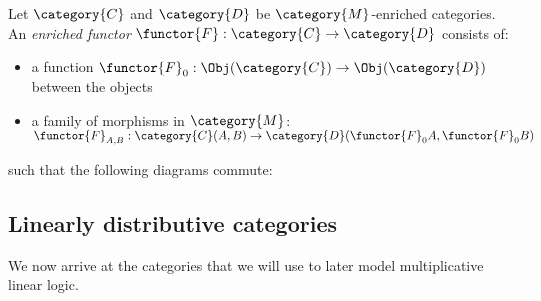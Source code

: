 \documentclass[DIN, pagenumber=false, fontsize=11pt, parskip=half, colorinlistoftodos, svgnames]{scrartcl}
\begin{document}
	\begin{definition}
		\label{def: enrichedFunctors}
		Let $\category{C} $ and $\category{D} $ be $\category{M} $-enriched categories. An \emph{enriched functor} $\functor{F} : \category{C} \rightarrow \category{D} $ consists of:
		\begin{itemize}
			\item 
			a function $\functor{F}_0 : \Obj(\category{C}) \rightarrow \Obj(\category{D}) $ between the objects
			\item 
			a family of morphisms in $\category{M} $: $\functor{F}_{A,B} : \category{C}(A, B) \rightarrow \category{D}(\functor{F}_0 A , \functor{F}_0 B) $
		\end{itemize}
		such that the following diagrams commute:
		\begin{center}
			
		\end{center}
	\end{definition}
\fi

	
	\subsection{Linearly distributive categories }
	\label{subsec: linDisCats}
	
	We now arrive at the categories that we will use to later model multiplicative linear logic.
	
\end{document}
